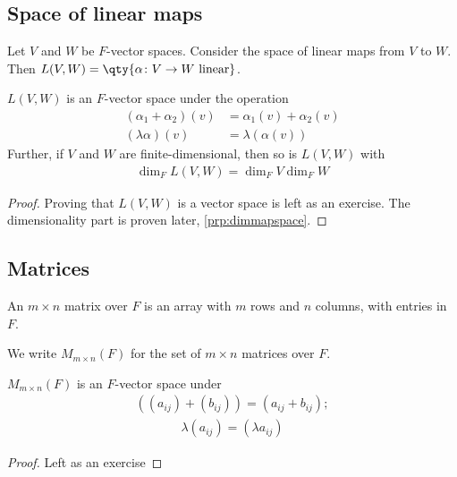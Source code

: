 \subsection{Space of linear maps}
Let $V$ and $W$ be $F$-vector spaces.
Consider the space of linear maps from $V$ to $W$.
Then $L(V,W) = \qty{\alpha \colon V \to W \text{ linear}}$.
\begin{proposition}
    $L(V,W)$ is an $F$-vector space under the operation
    \begin{align*}
        (\alpha_1 + \alpha_2)(v) &= \alpha_1(v) + \alpha_2(v) \\
        (\lambda \alpha)(v) &= \lambda( \alpha(v) )
    \end{align*}
    Further, if $V$ and $W$ are finite-dimensional, then so is $L(V,W)$ with
    \begin{align*}
        \dim_F L(V,W) = \dim_F V \dim_F W
    \end{align*}
\end{proposition}
\begin{proof}
    Proving that $L(V,W)$ is a vector space is left as an exercise.
    The dimensionality part is proven later, \cref{prp:dimmapspace}.
\end{proof}

\subsection{Matrices}
\begin{definition}[Matrix]
    An $m \times n$ matrix over $F$ is an array with $m$ rows and $n$ columns, with entries in $F$.
\end{definition}
\begin{notation}
    We write $M_{m \times n}(F)$ for the set of $m \times n$ matrices over $F$.
\end{notation} 

\begin{proposition}
    $M_{m \times n}(F)$ is an $F$-vector space under
    \begin{align*}
        ((a_{ij}) + (b_{ij})) = (a_{ij} + b_{ij});
    \end{align*}
    \begin{align*}
        \lambda (a_{ij}) = (\lambda a_{ij})
    \end{align*}
\end{proposition}
\begin{proof}
    Left as an exercise
\end{proof}

